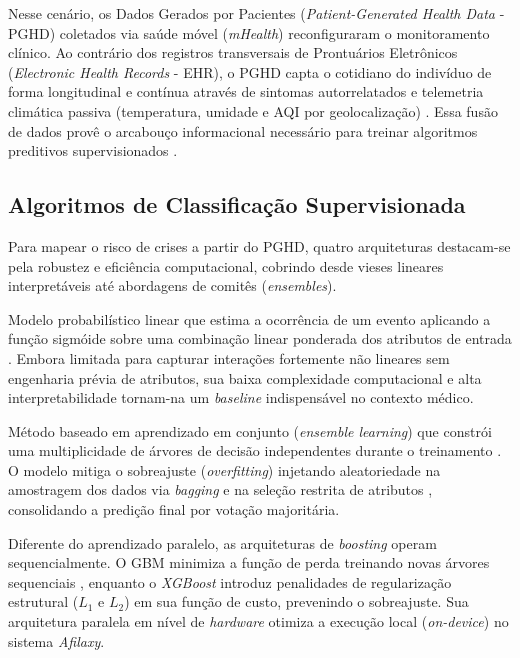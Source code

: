 \documentclass[12pt]{article}
\begin{document}
Nesse cenário, os Dados Gerados por Pacientes (\textit{Patient-Generated Health Data} - PGHD) coletados via saúde móvel (\textit{mHealth}) reconfiguraram o monitoramento clínico. Ao contrário dos registros transversais de Prontuários Eletrônicos (\textit{Electronic Health Records} - EHR), o PGHD capta o cotidiano do indivíduo de forma longitudinal e contínua através de sintomas autorrelatados e telemetria climática passiva (temperatura, umidade e AQI por geolocalização) \cite{demiris2019}. Essa fusão de dados provê o arcabouço informacional necessário para treinar algoritmos preditivos supervisionados \cite{tsang2022}.

\subsection{Algoritmos de Classificação Supervisionada}
Para mapear o risco de crises a partir do PGHD, quatro arquiteturas destacam-se pela robustez e eficiência computacional, cobrindo desde vieses lineares interpretáveis até abordagens de comitês (\textit{ensembles}).

\begin{description}
    \setlength{\itemsep}{1pt}
    \setlength{\parskip}{0pt}
    \setlength{\parsep}{0pt}
    \item[\textbullet~Regressão Logística:] Modelo probabilístico linear que estima a ocorrência de um evento aplicando a função sigmóide sobre uma combinação linear ponderada dos atributos de entrada \cite{hastie2009}. Embora limitada para capturar interações fortemente não lineares sem engenharia prévia de atributos, sua baixa complexidade computacional e alta interpretabilidade tornam-na um \textit{baseline} indispensável no contexto médico.
    \item[\textbullet~Random Forest:] Método baseado em aprendizado em conjunto (\textit{ensemble learning}) que constrói uma multiplicidade de árvores de decisão independentes durante o treinamento \cite{breiman2001}. O modelo mitiga o sobreajuste (\textit{overfitting}) injetando aleatoriedade na amostragem dos dados via \textit{bagging} e na seleção restrita de atributos \cite{james2021}, consolidando a predição final por votação majoritária.
    \item[\textbullet~GBM e XGBoost:] Diferente do aprendizado paralelo, as arquiteturas de \textit{boosting} operam sequencialmente. O GBM minimiza a função de perda treinando novas árvores sequenciais \cite{hastie2009}, enquanto o \textit{XGBoost} introduz penalidades de regularização estrutural ($L_1$ e $L_2$) em sua função de custo, prevenindo o sobreajuste. Sua arquitetura paralela em nível de \textit{hardware} otimiza a execução local (\textit{on-device}) no sistema \textit{Afilaxy}.
\end{description}
\end{document}
